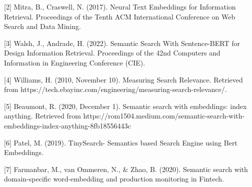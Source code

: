 \documentclass[
	a4paper, %
	10pt, %
	unnumberedsections, %
	twoside, %
]{LTJournalArticle}
\begin{document}
\enter

[2] Mitra, B., Craswell, N. (2017). Neural Text Embeddings for Information Retrieval. Proceedings of the Tenth ACM International Conference on Web Search and Data Mining.

\enter

[3] Walsh, J., Andrade, H. (2022). Semantic Search With Sentence-BERT for Design Information Retrieval. Proceedings of the 42nd Computers and Information in Engineering Conference (CIE).

\enter

[4] Williams, H. (2010, November 10). Measuring Search Relevance. Retrieved from https://tech.ebayinc.com/engineering/measuring-search-relevance/. 

\enter

[5] Beaumont, R. (2020, December 1). Semantic search with embeddings: index anything. Retrieved from https://rom1504.medium.com/semantic-search-with-embeddings-index-anything-8fb18556443c

\enter

[6] Patel, M. (2019). TinySearch- Semantics based Search Engine using Bert Embeddings. 

\enter 

[7] Farmanbar, M., van Ommeren, N., \& Zhao, B. (2020). Semantic search with domain-specific word-embedding and production monitoring in Fintech.
\end{document}

